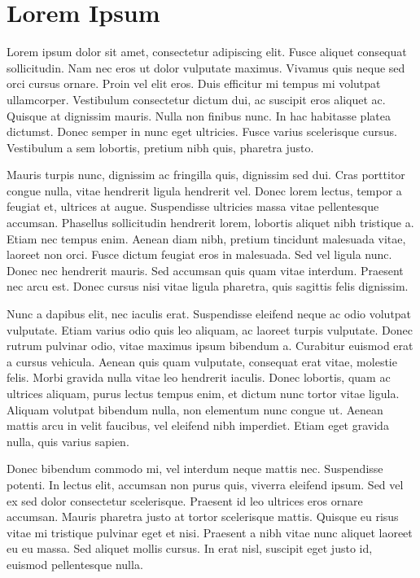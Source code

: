 \chapter{Lorem Ipsum}

Lorem ipsum dolor sit amet, consectetur adipiscing elit. Fusce aliquet consequat sollicitudin. Nam nec eros ut dolor vulputate maximus. Vivamus quis neque sed orci cursus ornare. Proin vel elit eros. Duis efficitur mi tempus mi volutpat ullamcorper. Vestibulum consectetur dictum dui, ac suscipit eros aliquet ac. Quisque at dignissim mauris. Nulla non finibus nunc. In hac habitasse platea dictumst. Donec semper in nunc eget ultricies. Fusce varius scelerisque cursus. Vestibulum a sem lobortis, pretium nibh quis, pharetra justo.

Mauris turpis nunc, dignissim ac fringilla quis, dignissim sed dui. Cras porttitor congue nulla, vitae hendrerit ligula hendrerit vel. Donec lorem lectus, tempor a feugiat et, ultrices at augue. Suspendisse ultricies massa vitae pellentesque accumsan. Phasellus sollicitudin hendrerit lorem, lobortis aliquet nibh tristique a. Etiam nec tempus enim. Aenean diam nibh, pretium tincidunt malesuada vitae, laoreet non orci. Fusce dictum feugiat eros in malesuada. Sed vel ligula nunc. Donec nec hendrerit mauris. Sed accumsan quis quam vitae interdum. Praesent nec arcu est. Donec cursus nisi vitae ligula pharetra, quis sagittis felis dignissim.

Nunc a dapibus elit, nec iaculis erat. Suspendisse eleifend neque ac odio volutpat vulputate. Etiam varius odio quis leo aliquam, ac laoreet turpis vulputate. Donec rutrum pulvinar odio, vitae maximus ipsum bibendum a. Curabitur euismod erat a cursus vehicula. Aenean quis quam vulputate, consequat erat vitae, molestie felis. Morbi gravida nulla vitae leo hendrerit iaculis. Donec lobortis, quam ac ultrices aliquam, purus lectus tempus enim, et dictum nunc tortor vitae ligula. Aliquam volutpat bibendum nulla, non elementum nunc congue ut. Aenean mattis arcu in velit faucibus, vel eleifend nibh imperdiet. Etiam eget gravida nulla, quis varius sapien.

Donec bibendum commodo mi, vel interdum neque mattis nec. Suspendisse potenti. In lectus elit, accumsan non purus quis, viverra eleifend ipsum. Sed vel ex sed dolor consectetur scelerisque. Praesent id leo ultrices eros ornare accumsan. Mauris pharetra justo at tortor scelerisque mattis. Quisque eu risus vitae mi tristique pulvinar eget et nisi. Praesent a nibh vitae nunc aliquet laoreet eu eu massa. Sed aliquet mollis cursus. In erat nisl, suscipit eget justo id, euismod pellentesque nulla.